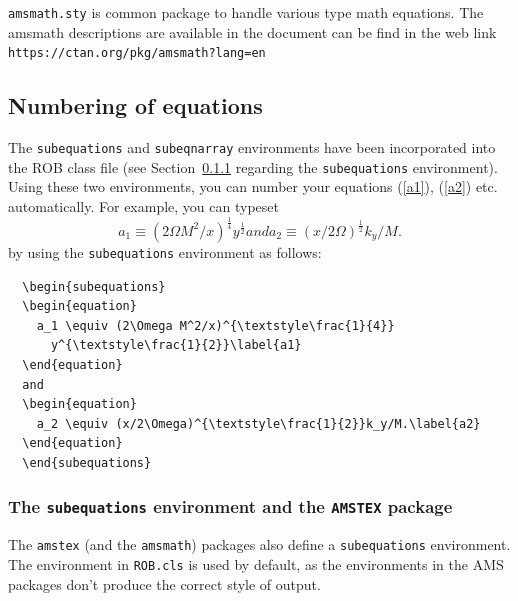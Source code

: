 \documentclass[DTMColor]{ROB-New}
\begin{document}
\verb"amsmath.sty" is common package to handle various type math equations. The amsmath descriptions are available in the document can be find in the web link \verb"https://ctan.org/pkg/amsmath?lang=en"

\subsection{Numbering of equations}

The \verb"subequations" and \verb"subeqnarray" environments have been
incorporated into the ROB class file (see Section~\ref{sub:amstex} regarding
the \verb"subequations" environment). Using these two environments,
you can number your equations (\ref{a1}), (\ref{a2}) etc. automatically.
For example, you can typeset
  \begin{subequations}
  \begin{equation}
    a_1 \equiv (2\Omega M^2/x)^{\textstyle\frac{1}{4}}
      y^{\textstyle\frac{1}{2}}\label{a1}
  \end{equation}
  and
  \begin{equation}
    a_2 \equiv (x/2\Omega)^{\textstyle\frac{1}{2}}k_y/M.\label{a2}
  \end{equation}
  \end{subequations}
by using the \verb"subequations" environment as follows:
%
\begin{verbatim}
  \begin{subequations}
  \begin{equation}
    a_1 \equiv (2\Omega M^2/x)^{\textstyle\frac{1}{4}}
      y^{\textstyle\frac{1}{2}}\label{a1}
  \end{equation}
  and
  \begin{equation}
    a_2 \equiv (x/2\Omega)^{\textstyle\frac{1}{2}}k_y/M.\label{a2}
  \end{equation}
  \end{subequations}
\end{verbatim}

\subsubsection{The \texttt{subequations} environment and the
  \texttt{AMSTEX} package} \label{sub:amstex}

The \verb"amstex" (and the \verb"amsmath") packages also define a
\verb"subequations" environment.  The environment in \verb"ROB.cls" is used
by default, as the environments in the AMS packages don't produce the correct
style of output.
\end{document}
